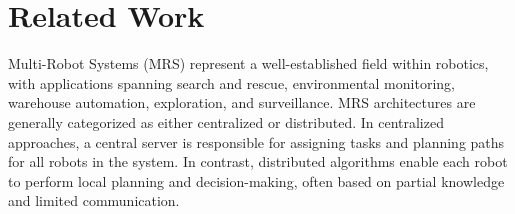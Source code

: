 



\section{Related Work}
Multi-Robot Systems (MRS) represent a well-established field within robotics, with applications spanning search and rescue, environmental monitoring, warehouse automation, exploration, and surveillance. 
MRS architectures are generally categorized as either centralized or distributed. 
In centralized approaches, a central server is responsible for assigning tasks and planning paths for all robots in the system. 
In contrast, distributed algorithms enable each robot to perform local planning and decision-making, often based on partial knowledge and limited communication.\\

